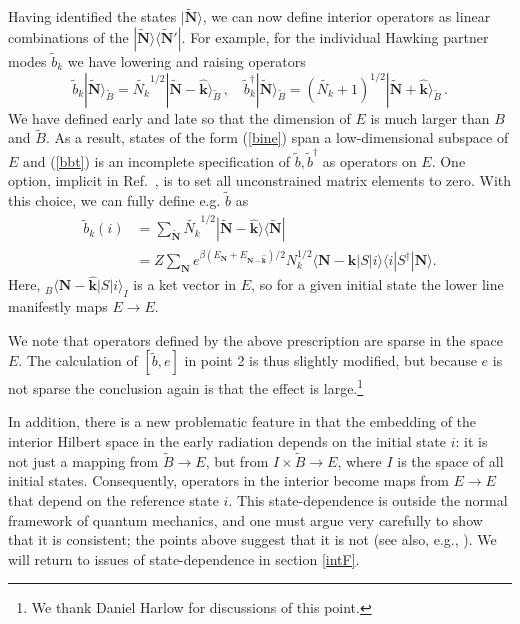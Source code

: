 \documentclass[12pt]{article}
\newcommand{\be}{\begin{equation}}
\newcommand{\ee}{\end{equation}}
\begin{document}
{Having identified the states $|\tilde {\pmb N} \rangle$, we can now define interior operators as linear combinations of the {$|\tilde {\pmb N}\rangle \langle
\tilde {\pmb N}' |$}.  For example, for the individual Hawking partner modes $\tilde b_k$ we have lowering and raising operators
{\be
\tilde b_k |\tilde {\pmb N} \rangle_{\tilde{B}} = \tilde{N_k}^{1/2} |\tilde{{\pmb N}} - \hat{{\pmb k}}  \rangle_{\tilde{B}}  \,,\quad
\tilde b^\dagger_k |\tilde {\pmb N} \rangle_{\tilde{B}} = (\tilde{N_k}+1)^{1/2} |\tilde{\pmb N}+  \hat{{\pmb k}} \rangle_{\tilde{B}} \,. \label{bbt}
\ee}
We have defined early and late so that the dimension of $E$ is much larger than $B$ and $\tilde{B}$.  As a result, states of the form (\ref{bine}) span a low-dimensional subspace of $E$ and  (\ref{bbt}) is an incomplete specification of $\tilde{b},\tilde{b}^\dagger$ as operators on $E$. One option, implicit in Ref.~\cite{Papadodimas:2012aq}, is to set all unconstrained matrix elements to zero. With this choice, we can fully define e.g. $\tilde b$ as
\begin{align}
\tilde{b}_k(i) &= \sum_{\tilde{\pmb{N}}}\tilde{N_k}^{1/2}|\tilde{{\pmb N}} - \hat{{\pmb{k}}}\rangle\langle \tilde{{\pmb{N}}}| \label{b3}\\
&=Z\sum_{\pmb{N}}e^{\beta (E_{\pmb{N}} + E_{\pmb{N} - \pmb{\hat{k}}})/2}N_k^{1/2}\langle \pmb{N} - \pmb{\hat{k}}|S|i\rangle\langle i|S^\dagger|\pmb{N}\rangle.\label{b2}
\end{align}
Here, ${}_B\langle\pmb{N} - \pmb{\hat{k}}|S|i\rangle_{I}$ is a ket vector in $E$, so for a given initial state the lower line manifestly maps $E\to E$.

We note that operators defined by the above prescription are
sparse in the space $E$. The calculation of $[\tilde b, e]$ in point 2 is thus slightly modified, but because $e$ is not sparse the conclusion again is that the effect is large.\footnote{We thank Daniel Harlow for discussions of this point.}


In addition, there is a new problematic feature in that the embedding of the interior Hilbert space in the early radiation depends on the initial state $i$: it is not just a mapping from $\tilde B \to E$, but from $ I \times \tilde B \to E$, where $I$ is the space of all initial states.
Consequently, operators in the interior become maps from $E \to E$ that depend on the reference state $i$.  This state-dependence is outside the normal framework of quantum mechanics, and one must argue very carefully to show that it is consistent; the points above suggest that it is not
(see also, e.g., \cite{Kapustin:2013yda}). We will return to issues of state-dependence in section \ref{intF}.

}
\end{document}

